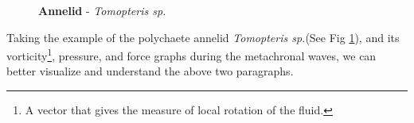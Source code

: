 \documentclass[12pt]{article}
\begin{document}
\begin{figure}[h!]
    \centering
      \caption{\textbf{Annelid} - \textit{Tomopteris sp.}}
      \label{Annelid}
\end{figure}
\par Taking the example of the polychaete annelid \textit{Tomopteris sp.}(See Fig \ref{Annelid}), and its vorticity\footnote{A vector that gives the  measure of local rotation of the fluid.}, pressure, and force graphs during the metachronal waves, we can better visualize and understand the above two paragraphs.
\end{document}
